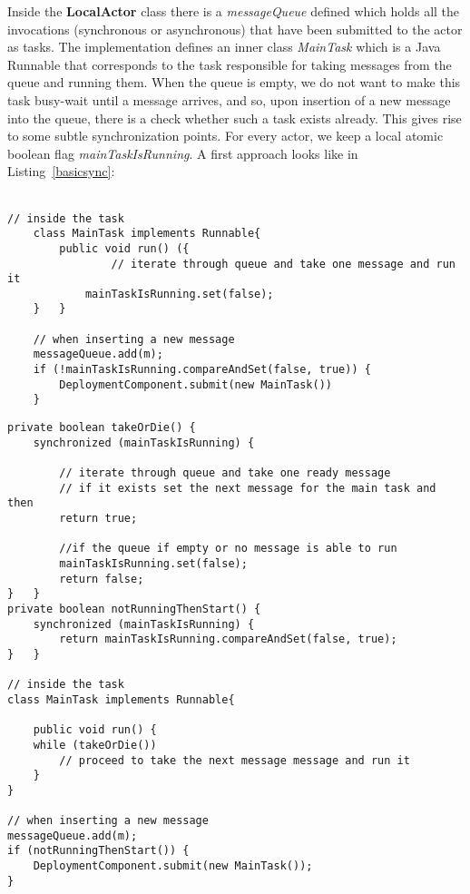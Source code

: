 \par Inside the \textbf{LocalActor} class there is a \textit{messageQueue} defined which holds all the invocations (synchronous or asynchronous) that have been submitted to the actor as tasks. The implementation defines an inner class \textit{MainTask} which is a Java Runnable that corresponds to the task responsible for taking messages from the queue and running them. When the queue is empty, we do not want to make this task busy-wait until a message arrives, and so, upon insertion of a new message into the queue, there is a check whether such a task exists already. This gives rise to some subtle synchronization points. For every actor, we keep a local atomic boolean flag \textit{mainTaskIsRunning}. A first approach looks like in Listing~\ref{basicsync}:  \\ \\

\begin{lstlisting}[float, caption= Basic Synchronization for the Demand-Driven Approach, label=basicsync]
	// inside the task
	class MainTask implements Runnable{
		public void run() ({
				// iterate through queue and take one message and run it
			mainTaskIsRunning.set(false);
	}	}
	
	// when inserting a new message
	messageQueue.add(m);
	if (!mainTaskIsRunning.compareAndSet(false, true)) {
		DeploymentComponent.submit(new MainTask())
	}
\end{lstlisting}
\begin{lstlisting}[caption= Complete Synchronization for the Demand-Driven Approach, label=completesync]
private boolean takeOrDie() {
	synchronized (mainTaskIsRunning) {
		
		// iterate through queue and take one ready message 
		// if it exists set the next message for the main task and then
		return true;
		
		//if the queue if empty or no message is able to run
		mainTaskIsRunning.set(false);
		return false;
}	}
private boolean notRunningThenStart() {
	synchronized (mainTaskIsRunning) {
		return mainTaskIsRunning.compareAndSet(false, true);
}	}

// inside the task
class MainTask implements Runnable{
	
	public void run() {
	while (takeOrDie())
		// proceed to take the next message message and run it	 
	}	
}

// when inserting a new message
messageQueue.add(m);
if (notRunningThenStart()) {
	DeploymentComponent.submit(new MainTask());
}
\end{lstlisting}


